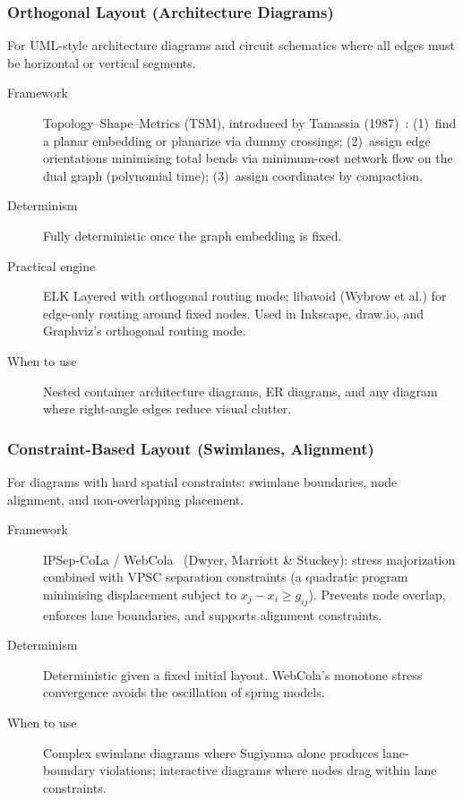 \subsubsection{Orthogonal Layout (Architecture Diagrams)}

For UML-style architecture diagrams and circuit schematics where all edges
must be horizontal or vertical segments.

\begin{description}
  \item[Framework] Topology--Shape--Metrics (TSM), introduced by
    Tamassia (1987)~\cite{tamassia1987}: (1)~find a planar embedding or
    planarize via dummy crossings; (2)~assign edge orientations minimising total
    bends via minimum-cost network flow on the dual graph (polynomial time);
    (3)~assign coordinates by compaction.
  \item[Determinism] Fully deterministic once the graph embedding is fixed.
  \item[Practical engine] ELK Layered with orthogonal routing mode;
    libavoid (Wybrow et al.) for edge-only routing around fixed nodes.
    Used in Inkscape, draw.io, and Graphviz's orthogonal routing mode.
  \item[When to use] Nested container architecture diagrams, ER diagrams,
    and any diagram where right-angle edges reduce visual clutter.
\end{description}

\subsubsection{Constraint-Based Layout (Swimlanes, Alignment)}

For diagrams with hard spatial constraints: swimlane boundaries, node
alignment, and non-overlapping placement.

\begin{description}
  \item[Framework] IPSep-CoLa / WebCola~\cite{webCola} (Dwyer, Marriott \&
    Stuckey): stress majorization combined with VPSC separation constraints
    (a quadratic program minimising displacement subject to $x_j - x_i \ge
    g_{ij}$).  Prevents node overlap, enforces lane boundaries, and supports
    alignment constraints.
  \item[Determinism] Deterministic given a fixed initial layout.
    WebCola's monotone stress convergence avoids the oscillation of spring
    models.
  \item[When to use] Complex swimlane diagrams where Sugiyama alone produces
    lane-boundary violations; interactive diagrams where nodes drag within
    lane constraints.
\end{description}

